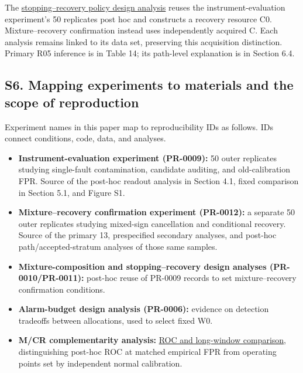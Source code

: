 \documentclass[10pt,a4paper]{article}
\begin{document}
The \href{https://github.com/metaSATOKEN/First-Order-Probes/blob/789f3c83bc85511d9e7a65f083c5806f2d36e8f2/numerics/analysis/pr0011_9adfa7a8c6e0_recovery_v2/PR0011_STOP_RECOVERY_REPORT_JA.md}{stopping–recovery policy design analysis} reuses the instrument-evaluation experiment's 50 replicates post hoc and constructs a recovery resource C0. Mixture–recovery confirmation instead uses independently acquired C. Each analysis remains linked to its data set, preserving this acquisition distinction. Primary R05 inference is in Table 14; its path-level explanation is in Section 6.4.

\subsection{S6. Mapping experiments to materials and the scope of reproduction}

Experiment names in this paper map to reproducibility IDs as follows. IDs connect conditions, code, data, and analyses.

\begin{itemize}\setlength{\itemsep}{2pt}
\item \textbf{Instrument-evaluation experiment (PR-0009):} 50 outer replicates studying single-fault contamination, candidate auditing, and old-calibration FPR. Source of the post-hoc readout analysis in Section 4.1, fixed comparison in Section 5.1, and Figure S1.
\item \textbf{Mixture–recovery confirmation experiment (PR-0012):} a separate 50 outer replicates studying mixed-sign cancellation and conditional recovery. Source of the primary 13, prespecified secondary analyses, and post-hoc path/accepted-stratum analyses of those same samples.
\item \textbf{Mixture-composition and stopping–recovery design analyses (PR-0010/PR-0011):} post-hoc reuse of PR-0009 records to set mixture–recovery confirmation conditions.
\item \textbf{Alarm-budget design analysis (PR-0006):} evidence on detection tradeoffs between allocations, used to select fixed W0.
\item \textbf{M/CR complementarity analysis:} \href{https://github.com/metaSATOKEN/First-Order-Probes/blob/789f3c83bc85511d9e7a65f083c5806f2d36e8f2/numerics/analysis/main_2ae37613a10478c8/ROC_AND_LONG_WINDOW_REPORT_JA.md}{ROC and long-window comparison}, distinguishing post-hoc ROC at matched empirical FPR from operating points set by independent normal calibration.
\end{itemize}
\end{document}
